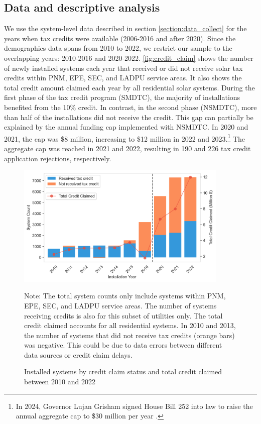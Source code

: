 \documentclass[12pt,twoside,letterpaper]{article}
\begin{document}
\subsection{Data and descriptive analysis}

We use the system-level data described in section \ref{section:data_collect} for the years when tax credits were available (2006-2016 and after 2020). Since the demographics data spans from 2010 to 2022, we restrict our sample to the overlapping years: 2010-2016 and 2020-2022. \autoref{fig:credit_claim} shows the number of newly installed systems each year that received or did not receive solar tax credits within PNM, EPE, SEC, and LADPU service areas. It also shows the total credit amount claimed each year by all residential solar systems. During the first phase of the tax credit program (SMDTC), the majority of installations benefited from the 10\% credit. In contrast, in the second phase (NSMDTC), more than half of the installations did not receive the credit. This gap can partially be explained by the annual funding cap implemented with NSMDTC. In 2020 and 2021, the cap was \$8 million, increasing to \$12 million in 2022 and 2023.\footnote{In 2024, Governor Lujan Grisham signed House Bill 252 into law to raise the annual aggregate cap to \$30 million per year \parencite{newsolarcap}.} The aggregate cap was reached in 2021 and 2022, resulting in 190 and 226 tax credit application rejections, respectively.

\begin{figure}[H]
    \centering
\includegraphics[width=0.9\textwidth]{figures/credit_claim.png}
    \caption{Installed systems by credit claim status and total credit claimed between 2010 and 2022}
    \label{fig:credit_claim}
      \begin{flushleft}
        \footnotesize Note: The total system counts only include systems within PNM, EPE, SEC, and LADPU service areas. The number of systems receiving credits is also for this subset of utilities only. The total credit claimed accounts for all residential systems. In 2010 and 2013, the number of systems that did not receive tax credits (orange bars) was negative. This could be due to data errors between different data sources or credit claim delays.
    \end{flushleft}
\end{figure}
\end{document}
